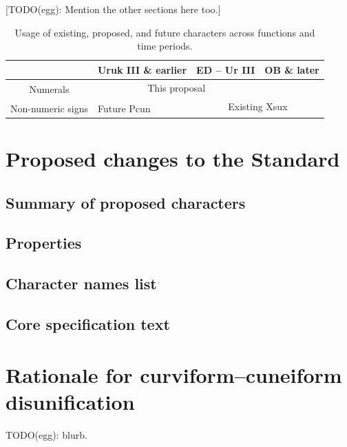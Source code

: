\documentclass[10pt, a4paper, twoside]{article}
\begin{document}
[TODO(egg): Mention the other sections here too.]

\begin{table}[htbp]
\begin{center}
\begin{tabular}{ l | l | l | l |} \cline{2-4}
                                                & Uruk III \& earlier & ED – Ur III                         & OB \& later    \\\hline
\multicolumn{1}{|c|}{\multirow{2}{*}{Numerals}} & \multicolumn{2}{|c|}{This proposal}                       &                \\\cline{2-4}
\multicolumn{1}{|c|}{}                          &                     & \multicolumn{2}{|c|}{\multirow{2}{*}{Existing Xsux}} \\\cline{1-2}
\multicolumn{1}{|c|}{Non-numeric signs}         & Future Pcun         & \multicolumn{2}{|c|}{}                               \\\hline
\end{tabular}
\caption{Usage of existing, proposed, and future characters across functions and time periods.}
\end{center}
\label{tableUnificationsDisunifications}
\end{table}

\section{Proposed changes to the Standard}
\label{proposal}
\subsection{Summary of proposed characters}
\subsection{Properties}
\label{properties}
\subsection{Character names list}
\subsection{Core specification text}

\section{Rationale for curviform--cuneiform disunification}
\label{disunificationRationale}
TODO(egg): blurb.
\end{document}
